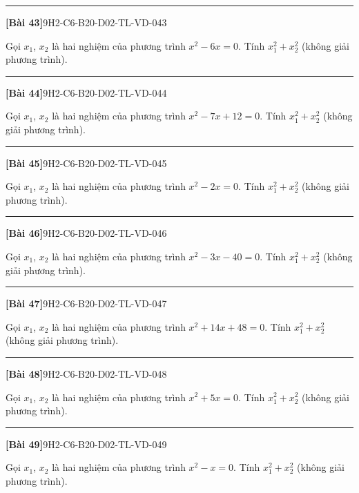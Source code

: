 \documentclass[12pt,a4paper]{article}
\newif\ifloigiai
\newenvironment{cauhoi}[2]{%
  \par\medskip\noindent\rule{\textwidth}{0.4pt}\par\nopagebreak
  \noindent\textbf{[#1]}\hfill{\scriptsize\ttfamily #2}\par\nopagebreak\smallskip}{\par}
\newcommand{\loigiai}[1]{\ifloigiai\par\smallskip\noindent\textit{Lời giải.} #1\par\fi}
\begin{document}
\begin{cauhoi}{Bài 43}{9H2-C6-B20-D02-TL-VD-043}
Gọi $x_1$, $x_2$ là hai nghiệm của phương trình $x^{2}-6x=0$. Tính $x_1^{2}+x_2^{2}$ (không giải phương trình).
\loigiai{Theo định lí Viète: $x_1+x_2=6$, $x_1x_2=0$. Suy ra $x_1^{2}+x_2^{2}=(x_1+x_2)^{2}-2x_1x_2=6^{2}-2\cdot(0)=36$.}
\end{cauhoi}
\begin{cauhoi}{Bài 44}{9H2-C6-B20-D02-TL-VD-044}
Gọi $x_1$, $x_2$ là hai nghiệm của phương trình $x^{2}-7x+12=0$. Tính $x_1^{2}+x_2^{2}$ (không giải phương trình).
\loigiai{Theo định lí Viète: $x_1+x_2=7$, $x_1x_2=12$. Suy ra $x_1^{2}+x_2^{2}=(x_1+x_2)^{2}-2x_1x_2=7^{2}-2\cdot(12)=25$.}
\end{cauhoi}
\begin{cauhoi}{Bài 45}{9H2-C6-B20-D02-TL-VD-045}
Gọi $x_1$, $x_2$ là hai nghiệm của phương trình $x^{2}-2x=0$. Tính $x_1^{2}+x_2^{2}$ (không giải phương trình).
\loigiai{Theo định lí Viète: $x_1+x_2=2$, $x_1x_2=0$. Suy ra $x_1^{2}+x_2^{2}=(x_1+x_2)^{2}-2x_1x_2=2^{2}-2\cdot(0)=4$.}
\end{cauhoi}
\begin{cauhoi}{Bài 46}{9H2-C6-B20-D02-TL-VD-046}
Gọi $x_1$, $x_2$ là hai nghiệm của phương trình $x^{2}-3x-40=0$. Tính $x_1^{2}+x_2^{2}$ (không giải phương trình).
\loigiai{Theo định lí Viète: $x_1+x_2=3$, $x_1x_2=-40$. Suy ra $x_1^{2}+x_2^{2}=(x_1+x_2)^{2}-2x_1x_2=3^{2}-2\cdot(-40)=89$.}
\end{cauhoi}
\begin{cauhoi}{Bài 47}{9H2-C6-B20-D02-TL-VD-047}
Gọi $x_1$, $x_2$ là hai nghiệm của phương trình $x^{2}+14x+48=0$. Tính $x_1^{2}+x_2^{2}$ (không giải phương trình).
\loigiai{Theo định lí Viète: $x_1+x_2=-14$, $x_1x_2=48$. Suy ra $x_1^{2}+x_2^{2}=(x_1+x_2)^{2}-2x_1x_2=-14^{2}-2\cdot(48)=100$.}
\end{cauhoi}
\begin{cauhoi}{Bài 48}{9H2-C6-B20-D02-TL-VD-048}
Gọi $x_1$, $x_2$ là hai nghiệm của phương trình $x^{2}+5x=0$. Tính $x_1^{2}+x_2^{2}$ (không giải phương trình).
\loigiai{Theo định lí Viète: $x_1+x_2=-5$, $x_1x_2=0$. Suy ra $x_1^{2}+x_2^{2}=(x_1+x_2)^{2}-2x_1x_2=-5^{2}-2\cdot(0)=25$.}
\end{cauhoi}
\begin{cauhoi}{Bài 49}{9H2-C6-B20-D02-TL-VD-049}
Gọi $x_1$, $x_2$ là hai nghiệm của phương trình $x^{2}-x=0$. Tính $x_1^{2}+x_2^{2}$ (không giải phương trình).
\loigiai{Theo định lí Viète: $x_1+x_2=1$, $x_1x_2=0$. Suy ra $x_1^{2}+x_2^{2}=(x_1+x_2)^{2}-2x_1x_2=1^{2}-2\cdot(0)=1$.}
\end{cauhoi}
\end{document}
